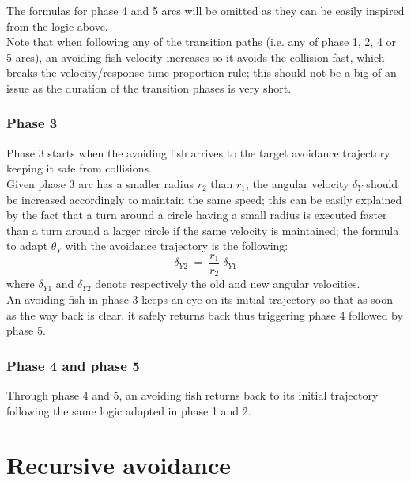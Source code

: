 \bigskip
The formulas for phase 4 and 5 arcs will be omitted as they can be easily inspired from the logic above.\\

Note that when following any of the transition paths (i.e. any of phase 1, 2, 4 or 5 arcs), an avoiding fish velocity increases so it avoids the collision fast, which breaks the velocity/response time proportion rule; this should not be a big of an issue as the duration of the transition phases is very short.

\subsubsection{Phase 3}
Phase 3 starts when the avoiding fish arrives to the target avoidance trajectory keeping it safe from collisions.\\

Given phase 3 arc has a smaller radius $r_2$ than $r_1$, the angular velocity $\delta_Y$ should be increased accordingly to maintain the same speed; this can be easily explained by the fact that a turn around a circle having a small radius is executed faster than a turn around a larger circle if the same velocity is maintained; the formula to adapt $\theta_Y$ with the avoidance trajectory is the following: 
\[
\delta_{Y2} \; = \; \frac{r_1}{r_2} \; \delta_{Y1}
\]
where $\delta_{Y1}$ and $\delta_{Y2}$ denote respectively the old and new angular velocities.\\

An avoiding fish in phase 3 keeps an eye on its initial trajectory so that as soon as the way back is clear, it safely returns back thus triggering phase 4 followed by phase 5.

\subsubsection{Phase 4 and phase 5}

Through phase 4 and 5, an avoiding fish returns back to its initial trajectory following the same logic adopted in phase 1 and 2.

\section{Recursive avoidance}
\label{sec:recursive-avoidance}

